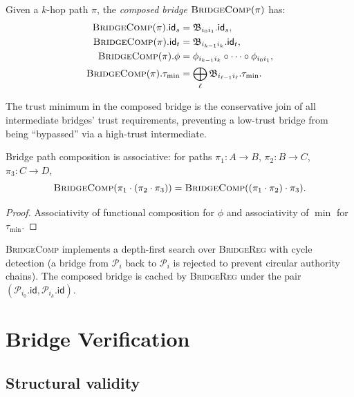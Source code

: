 \documentclass[11pt]{article}
\newcommand{\Pack}{\mathcal{P}}
\newcommand{\Brid}{\mathfrak{B}}
\newcommand{\PackId}{\mathsf{id}}
\newcommand{\BR}{\textsc{BridgeReg}}
\newcommand{\BC}{\textsc{BridgeComp}}
\begin{document}
\begin{definition}
\label{def:composed-bridge}
Given a $k$-hop path $\pi$, the \emph{composed bridge}
$\BC(\pi)$ has:
\begin{align*}
  \BC(\pi).\PackId_s &= \Brid_{i_0 i_1}.\PackId_s,\\
  \BC(\pi).\PackId_t &= \Brid_{i_{k-1} i_k}.\PackId_t,\\
  \BC(\pi).\phi      &= \phi_{i_{k-1} i_k} \circ \cdots \circ \phi_{i_0 i_1},\\
  \BC(\pi).\tau_{\min} &= \bigoplus_{\ell} \Brid_{i_{\ell-1}i_\ell}.\tau_{\min}.
\end{align*}
\end{definition}

The trust minimum in the composed bridge is the conservative join of
all intermediate bridges' trust requirements, preventing a
low-trust bridge from being ``bypassed'' via a high-trust intermediate.

\begin{proposition}
\label{prop:assoc}
Bridge path composition is associative: for paths
$\pi_1 : A \to B$, $\pi_2 : B \to C$, $\pi_3 : C \to D$,
\[
  \BC(\pi_1 \cdot (\pi_2 \cdot \pi_3))
  = \BC((\pi_1 \cdot \pi_2) \cdot \pi_3).
\]
\end{proposition}
\begin{proof}
Associativity of functional composition for $\phi$ and associativity
of $\min$ for $\tau_{\min}$.
\end{proof}

\BC{} implements a depth-first search over \BR{} with cycle detection
(a bridge from $\Pack_i$ back to $\Pack_i$ is rejected to prevent
circular authority chains).  The composed bridge is cached by
\BR{} under the pair $(\Pack_{i_0}.\PackId, \Pack_{i_k}.\PackId)$.

\section{Bridge Verification}
\label{sec:verification}

\subsection{Structural validity}
\end{document}
